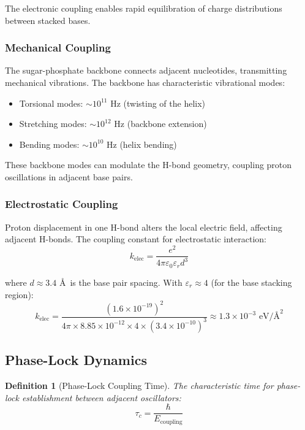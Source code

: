 \documentclass[twocolumn,10pt]{article}
\newtheorem{definition}[theorem]{Definition}
\theoremstyle{remark}
\begin{document}
The electronic coupling enables rapid equilibration of charge distributions between stacked bases.

\subsubsection{Mechanical Coupling}

The sugar-phosphate backbone connects adjacent nucleotides, transmitting mechanical vibrations. The backbone has characteristic vibrational modes:

\begin{itemize}
\item Torsional modes: $\sim 10^{11}$ Hz (twisting of the helix)
\item Stretching modes: $\sim 10^{12}$ Hz (backbone extension)
\item Bending modes: $\sim 10^{10}$ Hz (helix bending)
\end{itemize}

These backbone modes can modulate the H-bond geometry, coupling proton oscillations in adjacent base pairs.

\subsubsection{Electrostatic Coupling}

Proton displacement in one H-bond alters the local electric field, affecting adjacent H-bonds. The coupling constant for electrostatic interaction:
\begin{equation}
k_{\mathrm{elec}} = \frac{e^2}{4\pi\varepsilon_0\varepsilon_r d^3}
\end{equation}

where $d \approx 3.4$ \AA\ is the base pair spacing. With $\varepsilon_r \approx 4$ (for the base stacking region):
\begin{equation}
k_{\mathrm{elec}} = \frac{(1.6 \times 10^{-19})^2}{4\pi \times 8.85 \times 10^{-12} \times 4 \times (3.4 \times 10^{-10})^3} \approx 1.3 \times 10^{-3} \text{ eV/\AA}^2
\end{equation}

\subsection{Phase-Lock Dynamics}

\begin{definition}[Phase-Lock Coupling Time]
The characteristic time for phase-lock establishment between adjacent oscillators:
\begin{equation}
\tau_c = \frac{\hbar}{E_{\mathrm{coupling}}}
\end{equation}
\end{definition}
\end{document}
